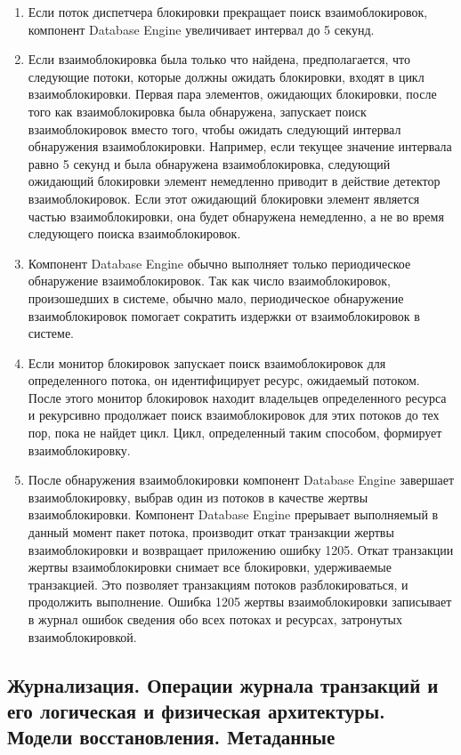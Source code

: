 \begin{enumerate}
	\item Если поток диспетчера блокировки прекращает поиск взаимоблокировок, компонент Database Engine увеличивает интервал до 5 секунд.
	\item Если взаимоблокировка была только что найдена, предполагается, что следующие потоки, которые должны ожидать блокировки, входят в цикл взаимоблокировки. Первая пара элементов, ожидающих блокировки, после того как взаимоблокировка была обнаружена, запускает поиск
	взаимоблокировок вместо того, чтобы ожидать следующий интервал обнаружения взаимоблокировки. Например, если текущее значение интервала равно 5 секунд и была обнаружена взаимоблокировка, следующий ожидающий блокировки элемент немедленно приводит в действие детектор взаимоблокировок. Если этот ожидающий блокировки элемент является частью взаимоблокировки, она будет обнаружена немедленно, а не во время следующего поиска взаимоблокировок.
	\item Компонент Database Engine обычно выполняет только периодическое обнаружение взаимоблокировок. Так как число взаимоблокировок, произошедших в системе, обычно мало, периодическое обнаружение взаимоблокировок помогает сократить издержки от взаимоблокировок в системе.
	\item Если монитор блокировок запускает поиск взаимоблокировок для определенного потока, он идентифицирует ресурс, ожидаемый потоком. После этого монитор блокировок находит владельцев определенного ресурса и рекурсивно продолжает поиск взаимоблокировок для этих потоков до тех пор, пока не найдет цикл. Цикл, определенный таким способом, формирует взаимоблокировку. 
	\item После обнаружения взаимоблокировки компонент Database Engine завершает взаимоблокировку, выбрав один из потоков в качестве жертвы взаимоблокировки. Компонент Database Engine прерывает выполняемый в данный момент пакет потока, производит откат транзакции жертвы
	взаимоблокировки и возвращает приложению ошибку 1205. Откат транзакции жертвы взаимоблокировки снимает все блокировки, удерживаемые транзакцией. Это позволяет транзакциям потоков разблокироваться, и продолжить выполнение. Ошибка 1205 жертвы взаимоблокировки
	записывает в журнал ошибок сведения обо всех потоках и ресурсах, затронутых взаимоблокировкой.
\end{enumerate}

\newpage

\subsection{Журнализация. Операции журнала транзакций и его логическая и физическая архитектуры. Модели восстановления. Метаданные}

